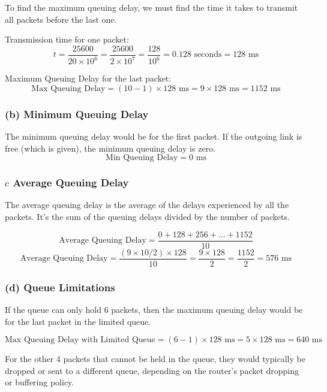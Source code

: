 \documentclass[
]{article}
\begin{document}
To find the maximum queuing delay, we must find the time it takes to
transmit all packets before the last one.

Transmission time for one packet: \[
t = \frac{{25600}}{{20 \times 10^6}} = \frac{{25600}}{{2 \times 10^7}} = \frac{{128}}{{10^6}} = 0.128 \text{ seconds} = 128 \text{ ms}
\]

Maximum Queuing Delay for the last packet: \[
\text{Max Queuing Delay} = (10 - 1) \times 128 \text{ ms} = 9 \times 128 \text{ ms} = 1152 \text{ ms}
\]

\hypertarget{b-minimum-queuing-delay}{%
\subsubsection{(b) Minimum Queuing
Delay}\label{b-minimum-queuing-delay}}

The minimum queuing delay would be for the first packet. If the outgoing
link is free (which is given), the minimum queuing delay is zero. \[
\text{Min Queuing Delay} = 0 \text{ ms}
\]

\hypertarget{c-average-queuing-delay}{%
\subsubsection{\texorpdfstring{\(c\) Average Queuing
Delay}{c Average Queuing Delay}}\label{c-average-queuing-delay}}

The average queuing delay is the average of the delays experienced by
all the packets. It's the sum of the queuing delays divided by the
number of packets.

\[
\text{Average Queuing Delay} = \frac{{0 + 128 + 256 + \ldots + 1152}}{10}
\] \[
\text{Average Queuing Delay} = \frac{{(9 \times 10 / 2) \times 128}}{10} = \frac{{9 \times 128}}{2} = \frac{{1152}}{2} = 576 \text{ ms}
\]

\hypertarget{d-queue-limitations}{%
\subsubsection{(d) Queue Limitations}\label{d-queue-limitations}}

If the queue can only hold 6 packets, then the maximum queuing delay
would be for the last packet in the limited queue.

\[
\text{Max Queuing Delay with Limited Queue} = (6 - 1) \times 128 \text{ ms} = 5 \times 128 \text{ ms} = 640 \text{ ms}
\]

For the other 4 packets that cannot be held in the queue, they would
typically be dropped or sent to a different queue, depending on the
router's packet dropping or buffering policy.
\end{document}
